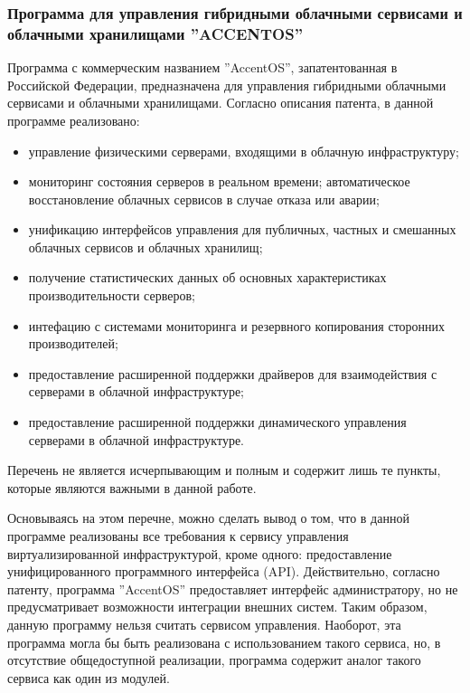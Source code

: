 \subsubsection{Программа для управления гибридными облачными сервисами и облачными хранилищами
''ACCENTOS''}
Программа с коммерческим названием ''AccentOS'', запатентованная в Российской Федерации\cite{accentos}, предназначена для управления гибридными облачными сервисами и облачными хранилищами.
Согласно описания патента, в данной программе реализовано:
\begin{itemize}
    \item управление физическими серверами, входящими в облачную инфраструктуру; 
    \item мониторинг состояния серверов в реальном времени; автоматическое восстановление облачных сервисов в случае отказа или аварии;
    \item унификацию интерфейсов управления для публичных, частных и смешанных облачных сервисов и облачных хранилищ;
    \item получение статистических данных об основных характеристиках производительности серверов;
    \item интефацию с системами мониторинга и резервного копирования сторонних производителей;
    \item предоставление расширенной поддержки драйверов для взаимодействия с серверами в облачной инфраструктуре;
    \item предоставление расширенной поддержки динамического управления серверами в облачной инфраструктуре.
\end{itemize}
Перечень не является исчерпывающим и полным и содержит лишь те пункты, которые являются важными в данной работе.

Основываясь на этом перечне, можно сделать вывод о том, что в данной программе реализованы все требования к сервису управления виртуализированной инфраструктурой, кроме одного: предоставление унифицированного программного интерфейса (API).
Действительно, согласно патенту, программа ''AccentOS'' предоставляет интерфейс администратору, но не предусматривает возможности интеграции внешних систем.
Таким образом, данную программу нельзя считать сервисом управления.
Наоборот, эта программа могла бы быть реализована с использованием такого сервиса, но, в отсутствие общедоступной реализации, программа содержит аналог такого сервиса как один из модулей.

